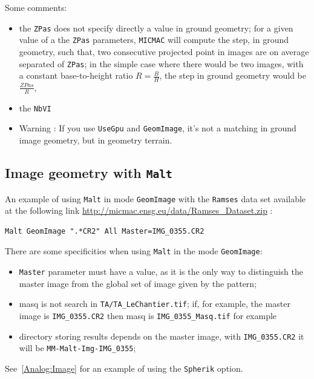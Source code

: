 Some comments:

\begin{itemize}
   \item  the {\tt ZPas} does not specify directly a value in ground geometry;
	 for a given value of a the {\tt ZPas} parameters,  {\tt MICMAC} will compute
	 the step, in ground geometry, such that, two consecutive projected point in images are
	 on average separated of {\tt ZPas};
	 in the simple case where there would be two images, with a constant base-to-height ratio $R=\frac{B}{H}$,
	 the step in ground geometry would be $\frac{ZPas}{R}$,

   \item the {\tt NbVI}   
   \item Warning : If you use {\tt UseGpu} and {\tt GeomImage}, it's not a matching in ground image geometry, but in geometry terrain.
\end{itemize}

\subsection{Image geometry with {\tt Malt}}

An example of using {\tt Malt} in mode {\tt GeomImage}
with the {\tt Ramses} data set available at the following link \url{http://micmac.ensg.eu/data/Ramses_Dataset.zip} :

\begin{verbatim}
Malt GeomImage ".*CR2" All Master=IMG_0355.CR2
\end{verbatim}

There are some specificities when using {\tt Malt} in the mode {\tt GeomImage}:

\begin{itemize}
   \item  {\tt Master} parameter must have a value, as it is the only way to
	  distinguish the master image from the global set of image given by the pattern;
   \item masq is not search in {\tt TA/TA\_LeChantier.tif}; if, for example,
	 the master  image is {\tt IMG\_0355.CR2} then masq is {\tt IMG\_0355\_Masq.tif}
	 for example
   \item directory storing results depends on the master image, with {\tt IMG\_0355.CR2}
	 it will be  {\tt MM-Malt-Img-IMG\_0355};

\end{itemize}


See~\ref{Analog:Image} for an example of using the {\tt Spherik} option.


